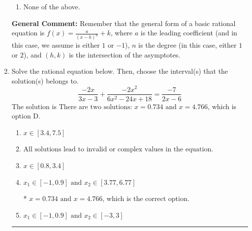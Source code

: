 \documentclass{extbook}[14pt]
\newcommand{\litem}[1]{\item #1

\rule{\textwidth}{0.4pt}}
\begin{document}
\begin{enumerate}
{\begin{enumerate}[label=\Alph*.]
\item None of the above.\end{enumerate}
\textbf{General Comment:} Remember that the general form of a basic rational equation is $ f(x) = \frac{a}{(x-h)^n} + k$, where $a$ is the leading coefficient (and in this case, we assume is either $1$ or $-1$), $n$ is the degree (in this case, either $1$ or $2$), and $(h, k)$ is the intersection of the asymptotes.
}
\litem{
Solve the rational equation below. Then, choose the interval(s) that the solution(s) belongs to.
\[ \frac{-2x}{3x -3} + \frac{-2x^{2}}{6x^{2} -24 x + 18} = \frac{-7}{2x -6} \]
The solution is \( \text{There are two solutions: } x = 0.734 \text{ and } x = 4.766 \), which is option D.\begin{enumerate}[label=\Alph*.]
\item \( x \in [3.4,7.5] \)


\item \( \text{All solutions lead to invalid or complex values in the equation.} \)


\item \( x \in [0.8,3.4] \)


\item \( x_1 \in [-1, 0.9] \text{ and } x_2 \in [3.77,6.77] \)

* $x = 0.734 \text{ and } x = 4.766$, which is the correct option.
\item \( x_1 \in [-1, 0.9] \text{ and } x_2 \in [-3,3] \)


\end{enumerate}

}
\end{enumerate}
\end{document}
